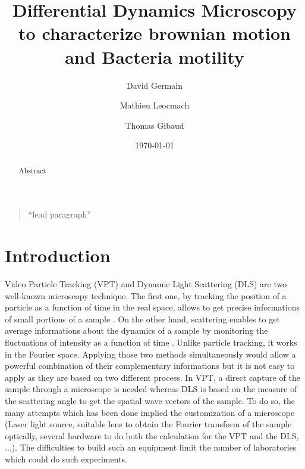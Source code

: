 \documentclass[%
 aip,
 jmp,%
 amsmath,amssymb,
reprint,%
]{revtex4-1}
\begin{document}

\title[Sample title]{Differential Dynamics Microscopy to characterize brownian motion and Bacteria motility}%

\author{David Germain}
\author{Mathieu Leocmach}
\author{Thomas Gibaud}

\date{\today}%

\begin{abstract}
Abstract
\end{abstract}

\maketitle

\begin{quotation}
``lead paragraph''
\end{quotation}

\section{\label{sec:level1}Introduction}

Video Particle Tracking (VPT) and Dynamic Light Scattering (DLS) are two well-known microscopy technique. The first one, by tracking the position of a particle as a function of time in the real space, allows to get precise informations of small portions of a sample \citep{7_jaqaman2008robust}. On the other hand, scattering enables to get average informations about the dynamics of a sample by monitoring the fluctuations of intensity as a function of time \citep{18_sartor2003dynamic}. Unlike particle tracking, it works in the Fourier space. Applying those two methods simultaneously would allow a powerful combination of their complementary informations but it is not easy to apply as they are based on two different process. In VPT, a direct capture of the sample through a microscope is needed whereas DLS is based on the measure of the scattering angle to get the spatial wave vectors of the sample. To do so, the many attempts which has been done implied the customization of a microscope \citep{27_kaplan1999light, 28_valentine2001microscope, 29_dzakpasu2004dynamic} (Laser light source, suitable lens to obtain the Fourier transform of the sample optically, several hardware to do both the calculation for the VPT and the DLS, ...). The difficulties to build such an equipment limit the number of laboratories which could do such experiments.
\end{document}
